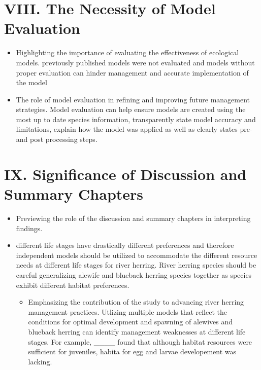 \documentclass[
]{book}
\providecommand{\tightlist}{%
  \setlength{\itemsep}{0pt}\setlength{\parskip}{0pt}}
\begin{document}
\hypertarget{viii.-the-necessity-of-model-evaluation}{%
\section{VIII. The Necessity of Model Evaluation}\label{viii.-the-necessity-of-model-evaluation}}

\begin{itemize}
\item
  Highlighting the importance of evaluating the effectiveness of ecological models.
  previously published models were not evaluated and models without proper evaluation can hinder management and accurate implementation of the model
\item
  The role of model evaluation in refining and improving future management strategies.
  Model evaluation can help ensure models are created using the most up to date species information, transparently state model accuracy and limitations, explain how the model was applied as well as clearly states pre- and post processing steps.
\end{itemize}

\hypertarget{ix.-significance-of-discussion-and-summary-chapters}{%
\section{IX. Significance of Discussion and Summary Chapters}\label{ix.-significance-of-discussion-and-summary-chapters}}

\begin{itemize}
\tightlist
\item
  Previewing the role of the discussion and summary chapters in interpreting findings.
\item
  different life stages have drastically different preferences and therefore independent models should be utilized to accommodate the different resource needs at different life stages for river herring. River herring species should be careful generalizing alewife and blueback herring species together as species exhibit different habitat preferences.

  \begin{itemize}
  \tightlist
  \item
    Emphasizing the contribution of the study to advancing river herring management practices.
    Utlizing multiple models that reflect the conditions for optimal development and spawning of alewives and blueback herring can identify management weaknesses at different life stages. For example, \_\_\_\_ found that although habitat resources were sufficient for juveniles, habita for egg and larvae developement was lacking.
  \end{itemize}
\end{itemize}
\end{document}
